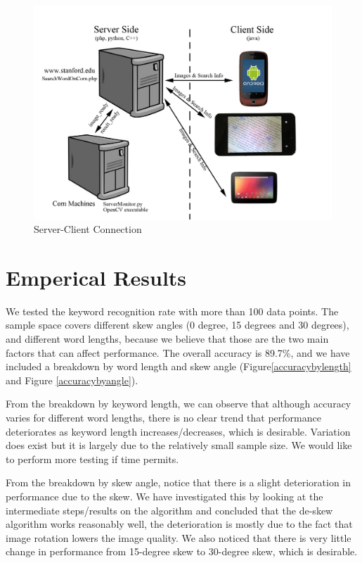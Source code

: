 \documentclass[conference]{IEEEtran}
\begin{document}
\begin{figure}
\center
\includegraphics[scale=0.15]{server_client_connection.jpg}
\caption{Server-Client Connection}
\label{server_client}
\end{figure}


\section{Emperical Results}
We tested the keyword recognition rate with more than 100 data points.  The sample space covers different skew angles (0 degree, 15 degrees and 30 degrees), and different word lengths, because we believe that those are the two main factors that can affect performance.    The overall accuracy is 89.7\%, and we have included a breakdown by word length and skew angle (Figure\ref{accuracybylength} and Figure \ref{accuracybyangle}).

From the breakdown by keyword length, we can observe that although accuracy varies for different word lengths, there is no clear trend that performance deteriorates as keyword length increases/decreases, which is desirable.  Variation does exist but it is largely due to the relatively small sample size.  We would like to perform more testing if time permits.

From the breakdown by skew angle, notice that there is a slight deterioration in performance due to the skew.  We have investigated this by looking at the intermediate steps/results on the algorithm and concluded that the de-skew algorithm works reasonably well, the deterioration is mostly due to the fact that image rotation lowers the image quality.  We also noticed that there is very little change in performance from 15-degree skew to 30-degree skew, which is desirable.
\end{document}
